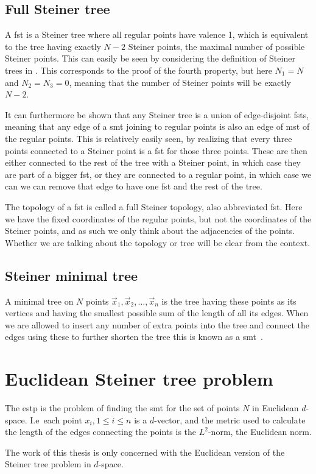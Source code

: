 \subsection{Full Steiner tree}
\label{sec:full-steiner-tree}

A \gls{fst} is a Steiner tree where all regular points have valence 1, which is
equivalent to the tree having exactly $N-2$ Steiner points, the maximal number
of possible Steiner points. This can easily be seen by considering the
definition of Steiner trees in . This corresponds to the
proof of the fourth property, but here $N_1 = N$ and $N_2 = N_3 = 0$, meaning
that the number of Steiner points will be exactly $N-2$.

It can furthermore be shown that any Steiner tree is a union of edge-disjoint
\glspl{fst}, meaning that any edge of a \gls{smt} joining to regular points is also
an edge of \gls{mst} of the regular points. This is relatively easily seen, by
realizing that every three points connected to a Steiner point is a \gls{fst} for
those three points. These are then either connected to the rest of the tree with
a Steiner point, in which case they are part of a bigger \gls{fst}, or they are
connected to a regular point, in which case we can we can remove that edge to
have one \gls{fst} and the rest of the tree.

The topology of a \gls{fst} is called a full Steiner topology, also abbreviated
\gls{fst}. Here we have the fixed coordinates of the regular points, but not the
coordinates of the Steiner points, and as such we only think about the
adjacencies of the points. Whether we are talking about the topology or tree
will be clear from the context.

\subsection{Steiner minimal tree}
\label{sec:steiner-minimal-tree}

A minimal tree on $N$ points $\vec{x}_{1},\vec{x}_{2},\ldots,\vec{x}_{n}$ is the
tree having these points as its vertices and having the smallest possible sum of
the length of all its edges. When we are allowed to insert any number of extra
points into the tree and connect the edges using these to further shorten the
tree this is known as a \gls{smt}~\cite{Gilbert1968}.


\section{Euclidean Steiner tree problem}
\label{sec:eucl-stein-tree}

The \gls{estp} is the problem of finding the \gls{smt} for the set of points $N$
in Euclidean $d$-space. I.e\ each point $x_{i}, 1 \le i \le n$ is a $d$-vector,
and the metric used to calculate the length of the edges connecting the points
is the $L^2$-norm, the Euclidean norm.

The work of this thesis is only concerned with the Euclidean version of the
Steiner tree problem in $d$-space.

